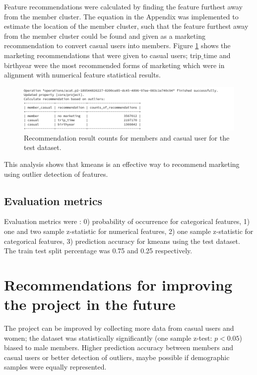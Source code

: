 \documentclass[11pt, onecolumn]{article}
\begin{document}
Feature recommendations were calculated by finding the feature furthest away from the member cluster. The equation in the Appendix was implemented to estimate the location of the member cluster, such that the feature furthest away from the member cluster could be found and given as a marketing recommendation to convert casual users into members. Figure \ref{recommendation_results} shows the marketing recommendations that were given to casual users; trip$\_$time and birthyear were the most recommended forms of marketing which were in alignment with numerical feature statistical results.
\begin{figure}[h]
\begin{center}
\includegraphics[width=0.9\linewidth]{recommendation_results.png}
\end{center}
\caption{Recommendation result counts for members and casual user for the test dataset.}
\label{recommendation_results}
\end{figure}
This analysis shows that kmeans is an effective way to recommend marketing using outlier detection of features.


\subsection{Evaluation metrics}

Evaluation metrics were : 0) probability of occurrence for categorical features, 1) one and two sample z-statistic for numerical features, 2) one sample z-statistic for categorical features, 3) prediction accuracy for kmeans using the test dataset. The train test split percentage was 0.75 and 0.25 respectively.


\section{Recommendations for improving the project in the future}

The project can be improved by collecting more data from casual users and women; the dataset was statistically significantly (one sample z-test: $p < 0.05$) biased to male members. Higher prediction accuracy between members and casual users or better detection of outliers, maybe possible if demographic samples were equally represented.  
\end{document}
